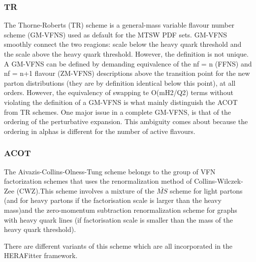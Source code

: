 \documentclass[11pt,a4paper]{article}
\begin{document}
\subsubsection{TR}

The Thorne-Roberts (TR) scheme is a general-mass variable flavour number scheme (GM-VFNS) used as default for the MTSW PDF sets. GM-VFNS smoothly connect the two reagions: scale below the heavy quark threshold and the scale above the heavy quark threshold. However, the definition is not unique.
A GM-VFNS can be defined by demanding equivalence of the nf = n (FFNS) and nf = n+1 flavour (ZM-VFNS) descriptions above the transition point for the new parton distributions
(they are by definition identical below this point), at all orders. However, the equivalency of swapping te O(mH2/Q2) terms without violating the definition of a GM-VFNS is what mainly distinguish the ACOT from TR schemes. 
One major issue in a complete GM-VFNS, is that of the ordering of the
perturbative expansion. This ambiguity comes about because the ordering in alphas is different for the number of active flavours.


 
\subsubsection{ACOT}

The Aivazis-Collins-Olness-Tung scheme  belongs to the group of VFN factorization schemes that uses the renormalization method of Collins-Wilczek-Zee (CWZ).This scheme involves a mixture of the $\bar{MS}$ scheme for light partons (and for heavy partons if the factorisation scale is larger than the heavy mass)and the zero-momentum subtraction renormalization scheme for graphs with heavy quark lines (if factorisation scale is smaller than the mass of the heavy quark threshold).

There are different variants of this scheme which are all incorporated in the HERAFitter framework.

\end{document}
